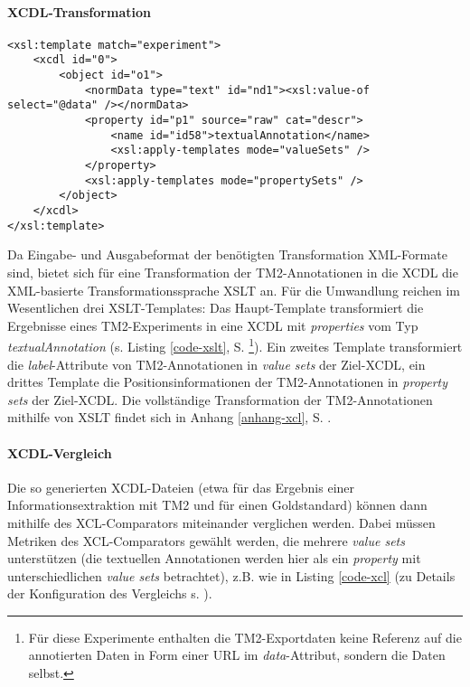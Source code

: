 \documentclass[abstracton, 12pt]{scrartcl}
\begin{document}
\paragraph{XCDL-Transformation}

\begin{lstlisting}[float, label=code-xslt, caption={Haupt-Template einer XSL-Transformation der TM2-Exportdaten in die XCDL}]
<xsl:template match="experiment">
    <xcdl id="0">
        <object id="o1">
            <normData type="text" id="nd1"><xsl:value-of select="@data" /></normData>
            <property id="p1" source="raw" cat="descr">
                <name id="id58">textualAnnotation</name>
                <xsl:apply-templates mode="valueSets" />
            </property>
            <xsl:apply-templates mode="propertySets" />
        </object>
    </xcdl>
</xsl:template>
\end{lstlisting}

Da Eingabe- und Ausgabeformat der benötigten Transformation XML-For\-ma\-te sind, bietet sich für eine Transformation der TM2-Annotationen in die XCDL die XML-basierte Transformationssprache XSLT an. Für die Umwandlung reichen im Wesentlichen drei XSLT-Templates: Das Haupt-Template transformiert die Ergebnisse eines TM2-Ex\-pe\-ri\-ments in eine XCDL mit \emph{properties} vom Typ \emph{textualAnnotation} (s. Listing \ref{code-xslt}, S. \pageref{code-xslt}\footnote{Für diese Experimente enthalten die TM2-Exportdaten keine Referenz auf die annotierten Daten in Form einer URL im \emph{data}-Attribut, sondern die Daten selbst.}). Ein zweites Template transformiert die \emph{label}-Attribute von TM2-Annotationen in \emph{value sets} der Ziel-XCDL, ein drittes Template die Positionsinformationen der TM2-Annotationen in \emph{property sets} der Ziel-XCDL. Die vollständige Transformation der TM2-Annotationen mithilfe von XSLT findet sich in Anhang \ref{anhang-xcl}, S. \pageref{anhang-xcl}.

\paragraph{XCDL-Vergleich}

Die so generierten XCDL-Dateien (etwa für das Ergebnis einer Informationsextraktion mit TM2 und für einen Goldstandard) können dann mithilfe des XCL-Comparators miteinander verglichen werden. Dabei müssen Metriken des XCL-Comparators gewählt werden, die mehrere \emph{value sets} unterstützen (die textuellen Annotationen werden hier als ein \emph{property} mit unterschiedlichen \emph{value sets} betrachtet), z.B. wie in Listing \ref{code-xcl} (zu Details der Konfiguration des Vergleichs s. \citealt[197]{HeydeggerEtAl2009}).
\end{document}
